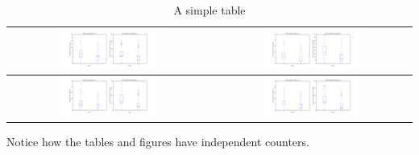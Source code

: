 \documentclass[a4paper,12pt]{article}
\begin{document}
\begin{table}[h!]
  \begin{center}
    \begin{tabular}{| c | c |}
    \hline
    \includegraphics[width=0.5\textwidth]{figures/box-Economics}
    &
    \includegraphics[width=0.5\textwidth]{figures/box-Business-Law}
    \\
    \hline
    \includegraphics[width=0.5\textwidth]{figures/box-Marketing}
	&    
    \includegraphics[width=0.5\textwidth]{figures/box-Management}
    \\
    \hline
    \end{tabular}
  \end{center}
  \caption{A simple table}
\end{table}


Notice how the tables and figures
have independent counters.
\end{document}
